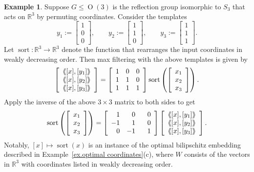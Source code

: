 \documentclass{article}
\theoremstyle{plain}
\theoremstyle{definition}
\newtheorem{example}[theorem]{Example}
\newcommand{\llangle}{\langle\hspace{-2.5pt}\langle}
\newcommand{\rrangle}{\rangle\hspace{-2.5pt}\rangle}
\begin{document}
\begin{example}
\label{ex.sort is linear of max filter}
Suppose $G\leq\operatorname{O}(3)$ is the reflection group isomorphic to $S_3$ that acts on $\mathbb{R}^3$ by permuting coordinates.
Consider the templates
\[
y_1:=\left[\begin{array}{c}1\\0\\0\end{array}\right],
\qquad
y_2:=\left[\begin{array}{c}1\\1\\0\end{array}\right],
\qquad
y_3:=\left[\begin{array}{c}1\\1\\1\end{array}\right].
\]
Let $\operatorname{sort}\colon\mathbb{R}^3\to\mathbb{R}^3$ denote the function that rearranges the input coordinates in weakly decreasing order.
Then max filtering with the above templates is given by
\[
\left[\begin{array}{c}\llangle [x],[y_1]\rrangle\\\llangle [x],[y_2]\rrangle\\ \llangle [x],[y_3]\rrangle\end{array}\right]
=\left[\begin{array}{ccc}1&0&0\\1&1&0\\1&1&1\end{array}\right]\operatorname{sort}\left(\left[\begin{array}{c}x_1\\x_2\\x_3\end{array}\right]\right).
\]
Apply the inverse of the above $3\times 3$ matrix to both sides to get
\[
\operatorname{sort}\left(\left[\begin{array}{c}x_1\\x_2\\x_3\end{array}\right]\right)
=\left[\begin{array}{rrr}1&0&0\\-1&1&0\\0&-1&\phantom{-}1\end{array}\right]\left[\begin{array}{c}\llangle [x],[y_1]\rrangle\\\llangle [x],[y_2]\rrangle\\ \llangle [x],[y_3]\rrangle\end{array}\right].
\]
Notably, $[x]\mapsto\operatorname{sort}(x)$ is an instance of the optimal bilipschitz embedding described in Example~\ref{ex.optimal coordinates}(c), where $W$ consists of the vectors in $\mathbb{R}^3$ with coordinates listed in weakly decreasing order.
\end{example}
\end{document}
